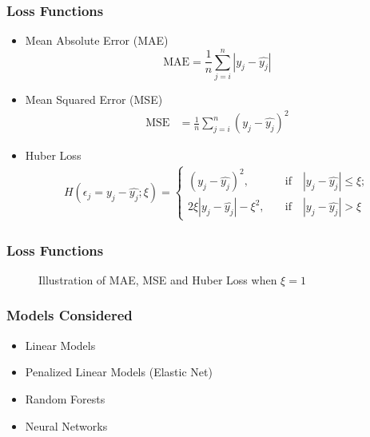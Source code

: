 \documentclass[]{beamer}
\begin{document}
\begin{frame}
\frametitle{Loss Functions}
\begin{itemize}
	\item Mean Absolute Error (MAE)
		\begin{equation}
		\text{MAE} = \frac{1}{n} \sum_{j = i}^{n} |y_j - \hat{y_j}|
		\end{equation}
	\item Mean Squared Error (MSE)
		\begin{align}
		\text{MSE} &= \frac{1}{n} \sum_{j = i}^{n} \left( y_j - \hat{y_j}\right) ^2
		\end{align}
	\item Huber Loss
		\begin{align}
		H(\epsilon_j = y_j - \hat{y_j};\xi) = 
		\begin{cases}
		\left( y_j - \hat{y_j}\right) ^2, 
		\quad &\text{if} \quad |y_j - \hat{y_j}| \leq \xi ; \\
		2 \xi  |y_j - \hat{y_j}| - \xi^2, 
		\quad &\text{if} \quad |y_j - \hat{y_j}| > \xi
		\end{cases}
		\end{align}
\end{itemize}
\end{frame}

\begin{frame}
\frametitle{Loss Functions}
\begin{figure}
	\begin{center}
	\end{center}
	\caption{Illustration of MAE, MSE and Huber Loss when $\xi = 1$}
	\label{fig:loss_functions}
\end{figure}
\end{frame}

\begin{frame}
\frametitle{Models Considered}
\begin{itemize}
	\item Linear Models
	\item Penalized Linear Models (Elastic Net)
	\item Random Forests
	\item Neural Networks
\end{itemize}
\end{frame}
\end{document}
